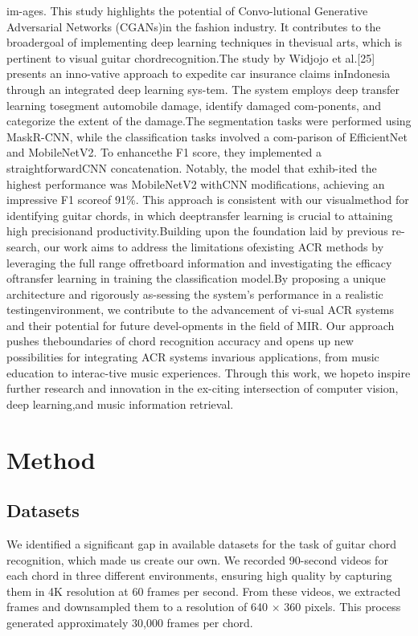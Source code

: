 \documentclass[10pt,twocolumn,letterpaper]{article}
\begin{document}
im-ages.  This study highlights the potential of Convo-lutional  Generative  Adversarial  Networks  (CGANs)in the fashion industry.  It contributes to the broadergoal of implementing deep learning techniques in thevisual arts, which is pertinent to visual guitar chordrecognition.The study by Widjojo et al.[25] presents an inno-vative approach to expedite car insurance claims inIndonesia  through  an  integrated  deep  learning  sys-tem.  The system employs deep transfer learning tosegment automobile damage, identify damaged com-ponents,  and  categorize  the  extent  of  the  damage.The segmentation tasks were performed using MaskR-CNN, while the classification tasks involved a com-parison of EfficientNet and MobileNetV2. To enhancethe  F1  score,  they  implemented  a  straightforwardCNN concatenation.  Notably, the model that exhib-ited the highest performance was MobileNetV2 withCNN modifications, achieving an impressive F1 scoreof 91\%.  This approach is consistent with our visualmethod for identifying guitar chords,  in which deeptransfer learning is crucial to attaining high precisionand productivity.Building upon the foundation laid by previous re-search,  our  work  aims  to  address  the  limitations  ofexisting ACR methods by leveraging the full range offretboard information and investigating the efficacy oftransfer learning in training the classification model.By proposing a unique architecture and rigorously as-sessing the system’s performance in a realistic testingenvironment, we contribute to the advancement of vi-sual ACR systems and their potential for future devel-opments in the field of MIR. Our approach pushes theboundaries of chord recognition accuracy and opens up new possibilities for integrating ACR systems invarious applications, from music education to interac-tive music experiences.  Through this work, we hopeto inspire further research and innovation in the ex-citing intersection of computer vision, deep learning,and music information retrieval.



\section{Method}

\subsection{Datasets}

We identified a significant gap in available datasets for the task of guitar chord recognition, which made us create our own. We recorded 90-second videos for each chord in three different environments, ensuring high quality by capturing them in 4K resolution at 60 frames per second. From these videos, we extracted frames and downsampled them to a resolution of 640 $\times$ 360 pixels. This process generated approximately 30,000 frames per chord.
\end{document}
